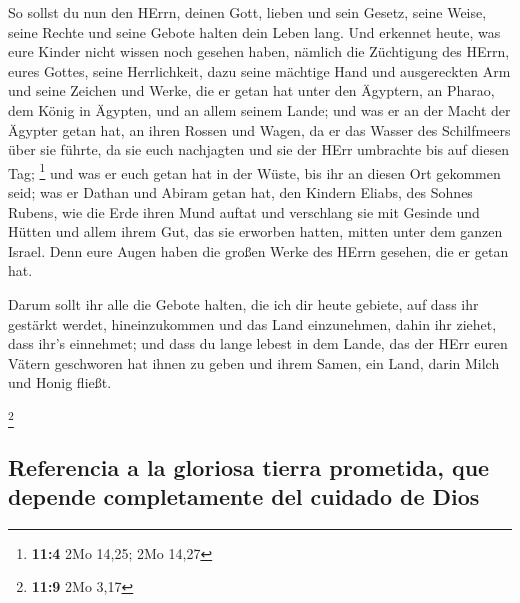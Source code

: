  So sollst du nun den HErrn, deinen Gott, lieben und sein
Gesetz, seine Weise, seine Rechte und seine Gebote halten dein Leben
lang.  Und erkennet heute, was eure Kinder nicht wissen
noch gesehen haben, nämlich die Züchtigung des HErrn, eures Gottes,
seine Herrlichkeit, dazu seine mächtige Hand und ausgereckten Arm
 und seine Zeichen und Werke, die er getan hat unter den
Ägyptern, an Pharao, dem König in Ägypten, und an allem seinem Lande;
 und was er an der Macht der Ägypter getan hat, an ihren
Rossen und Wagen, da er das Wasser des Schilfmeers über sie führte, da
sie euch nachjagten und sie der HErr umbrachte bis auf diesen Tag;
\footnote{\textbf{11:4} 2Mo 14,25; 2Mo 14,27}  und was er
euch getan hat in der Wüste, bis ihr an diesen Ort gekommen seid;
 was er Dathan und Abiram getan hat, den Kindern Eliabs,
des Sohnes Rubens, wie die Erde ihren Mund auftat und verschlang sie mit
Gesinde und Hütten und allem ihrem Gut, das sie erworben hatten, mitten
unter dem ganzen Israel.  Denn eure Augen haben die großen
Werke des HErrn gesehen, die er getan hat.

 Darum sollt ihr alle die Gebote halten, die ich dir heute
gebiete, auf dass ihr gestärkt werdet, hineinzukommen und das Land
einzunehmen, dahin ihr ziehet, dass ihr's einnehmet;  und
dass du lange lebest in dem Lande, das der HErr euren Vätern geschworen
hat ihnen zu geben und ihrem Samen, ein Land, darin Milch und Honig
fließt.

\footnote{\textbf{11:9} 2Mo 3,17}

\hypertarget{referencia-a-la-gloriosa-tierra-prometida-que-depende-completamente-del-cuidado-de-dios}{%
\subsection{Referencia a la gloriosa tierra prometida, que depende
completamente del cuidado de
Dios}\label{referencia-a-la-gloriosa-tierra-prometida-que-depende-completamente-del-cuidado-de-dios}}

